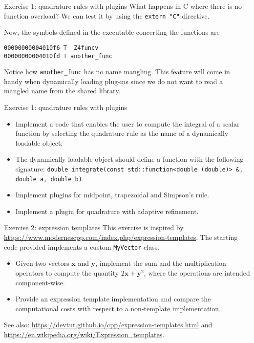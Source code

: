 \documentclass[10pt,aspectratio=169]{beamer}
\begin{document}
\begin{frame}[fragile]{Exercise 1: quadrature rules with plugins}
    What happens in C where there is no function overload? We can test it by using the \texttt{extern "C"} directive.
    
    \vfill
	Now, the symbols defined in the executable concerting the functions are 
\begin{verbatim}
00000000004010f6 T _Z4funcv
00000000004010fd T another_func
\end{verbatim}
Notice how \texttt{another\_func} has no name mangling. This feature will come in handy when dynamically loading plug-ins since we do not want to read a mangled name from the shared library.
\end{frame}


    

\begin{frame}{Exercise 1: quadrature rules with plugins}
\begin{itemize}
\item Implement a code that enables the user to compute the integral of a scalar function by selecting the quadrature rule as the name of a dynamically loadable object;
\item The dynamically loadable object should define a function with the following signature:
\texttt{double integrate(const std::function<double (double)> \&, double a, double b)}.
\item Implement plugins for midpoint, trapezoidal and Simpson's rule.
\item Implement a plugin for quadrature with adaptive refinement.
\end{itemize}
\end{frame}

\begin{frame}{Exercise 2: expression templates}
This exercise is inspired by \url{https://www.modernescpp.com/index.php/expression-templates}.
\vfill
The starting code provided implements a custom \texttt{MyVector} class.
\begin{itemize}
\item Given two vectors $\mathbf{x}$ and $\mathbf{y}$, implement the sum and the multiplication operators to compute the quantity $2\mathbf{x} + \mathbf{y}^2$, where the operations are intended component-wise.
\item Provide an expression template implementation and compare the computational costs with respect to a non-template implementation.
\end{itemize}
\vfill
{\small See also: \url{https://devtut.github.io/cpp/expression-templates.html} and \url{https://en.wikipedia.org/wiki/Expression_templates}.}
\end{frame}
\end{document}
